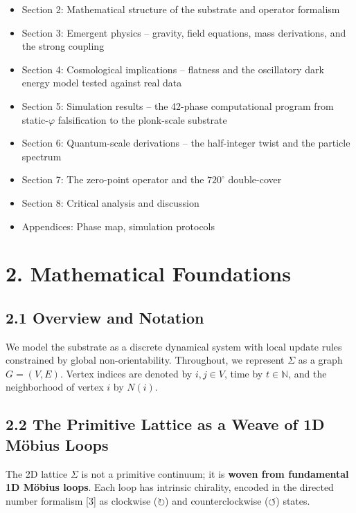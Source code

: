 \documentclass[
  11pt,
]{article}
\providecommand{\tightlist}{%
  \setlength{\itemsep}{0pt}\setlength{\parskip}{0pt}}
\begin{document}
\begin{itemize}
\tightlist
\item
  Section 2: Mathematical structure of the substrate and operator
  formalism
\item
  Section 3: Emergent physics -- gravity, field equations, mass
  derivations, and the strong coupling
\item
  Section 4: Cosmological implications -- flatness and the oscillatory
  dark energy model tested against real data
\item
  Section 5: Simulation results -- the 42-phase computational program
  from static-\(\varphi\) falsification to the plonk-scale substrate
\item
  Section 6: Quantum-scale derivations -- the half-integer twist and the
  particle spectrum
\item
  Section 7: The zero-point operator and the \(720^{\circ}\)
  double-cover
\item
  Section 8: Critical analysis and discussion
\item
  Appendices: Phase map, simulation protocols
\end{itemize}

\section{2. Mathematical Foundations}\label{mathematical-foundations}

\subsection{2.1 Overview and Notation}\label{overview-and-notation}

We model the substrate as a discrete dynamical system with local update
rules constrained by global non-orientability. Throughout, we represent
\(\Sigma\) as a graph \(G = (V, E)\). Vertex indices are denoted by
\(i, j \in V\), time by \(t \in \mathbb{N}\), and the neighborhood of
vertex \(i\) by \(N(i)\).

\subsection{2.2 The Primitive Lattice as a Weave of 1D Möbius
Loops}\label{the-primitive-lattice-as-a-weave-of-1d-muxf6bius-loops}

The 2D lattice \(\Sigma\) is not a primitive continuum; it is
\textbf{woven from fundamental 1D Möbius loops}. Each loop has intrinsic
chirality, encoded in the directed number formalism {[}3{]} as clockwise
(\(\circlearrowright\)) and counterclockwise (\(\circlearrowleft\))
states.
\end{document}
